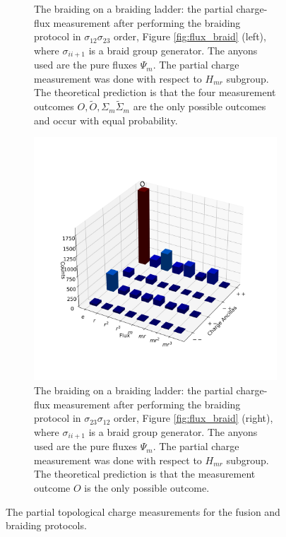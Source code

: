 \documentclass[a4paper,twocolumn,11pt]{quantumarticle}
\begin{document}
\begin{figure}
\begin{subfigure}{0.47\textwidth}
    \caption{The braiding on a braiding ladder: the partial charge-flux measurement after performing the braiding protocol in $\sigma_{12}\sigma_{23}$ order, Figure \ref{fig:flux_braid} (left), where $\sigma_{ii+1}$ is a braid group generator. The anyons used are the pure fluxes $\Psi_m$. The partial charge measurement was done with respect to $H_{mr}$ subgroup. The theoretical prediction is that the four measurement outcomes $O,\tilde O,\Sigma_m \tilde{\Sigma}_m$ are the only possible outcomes and occur with equal probability.} 
    \label{fig:braid_fuse}
\end{subfigure}\hfill
\begin{subfigure}{0.47\textwidth}
    \includegraphics[width=\linewidth]{Figures/braid_link.png}
    \caption{The braiding on a braiding ladder: the partial charge-flux measurement after performing the braiding protocol in $\sigma_{23}\sigma_{12}$ order, Figure \ref{fig:flux_braid} (right), where $\sigma_{ii+1}$ is a braid group generator. The anyons used are the pure fluxes $\Psi_m$. The partial charge measurement was done with respect to $H_{mr}$ subgroup. The theoretical prediction is that the measurement outcome $O$ is the only possible outcome.}
    \label{fig:braid_link}
\end{subfigure}
\caption{The partial topological charge measurements for the fusion and braiding protocols.}
\label{fig:red_charge_res}
\end{figure}
\end{document}
